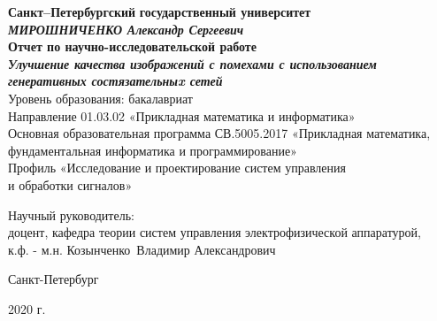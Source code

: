 \documentclass{article}
\begin{document}
\begin{titlepage}
\begin{center}
\textbf{Санкт--Петербургский}
\textbf{государственный университет}
\vspace{35mm} \\
\textbf{\textit{\large МИРОШНИЧЕНКО Александр Сергеевич}} \\[8mm]
\textbf{\large Отчет по научно-исследовательской работе}\\[3mm]
\textbf{\textit{\large Улучшение качества изображений с помехами с
использованием генеративных состязательныx сетей}} \\
\vspace{20mm}
Уровень образования: бакалавриат\\
Направление 01.03.02 «Прикладная математика и информатика»\\
Основная образовательная программа СВ.5005.2017
«Прикладная математика, фундаментальная информатика и программирование»\\
Профиль «Исследование и проектирование систем управления\\ и обработки сигналов»\\[30mm]
\begin{flushright}
{Научный руководитель:} \\
доцент, кафедра теории систем управления электрофизической аппаратурой, \\к.ф. - м.н.  Козынченко~Владимир Александрович 
\end{flushright}
\vfill 
{Санкт-Петербург}
\par{2020 г.}
\end{center}
\end{titlepage}
\addtocounter{page}{1}

\tableofcontents

\newpage
{}
\end{document}
